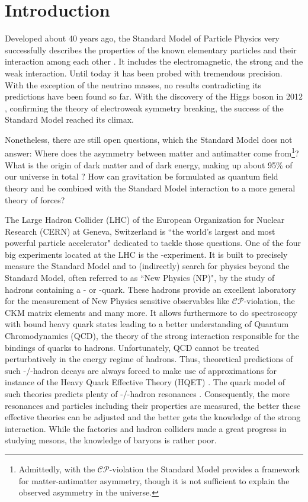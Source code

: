 \chapter{Introduction}
\label{sec:Introduction}
Developed about 40 years ago, the Standard Model of Particle Physics very successfully describes the properties of the known elementary particles and their interaction among each other \cite{SM_Glashow, SM_Salam, SM_Weinberg}.
It includes the electromagnetic, the strong and the weak interaction.
Until today it has been probed with tremendous precision.
With the exception of the neutrino masses, no results contradicting its predictions have been found so far.
With the discovery of the Higgs boson in 2012 \cite{Higgs_ATLAS, Higgs_CMS}, confirming the theory of electroweak symmetry breaking, the success of the Standard Model reached its climax.

Nonetheless, there are still open questions, which the Standard Model does not answer:
Where does the asymmetry between matter and antimatter come from\footnote{Admittedly, with the $\mathcal{CP}$-violation the Standard Model provides a framework for matter-antimatter asymmetry, though it is not sufficient to explain the observed asymmetry in the universe.}?
What is the origin of dark matter and of dark energy, making up about 95\% of our universe in total \cite{Planck_Universe}?
How can gravitation be formulated as quantum field theory and be combined with the Standard Model interaction to a more general theory of forces?

The Large Hadron Collider (LHC) of the European Organization for Nuclear Research (CERN) at Geneva, Switzerland is ``the world's largest and most powerful particle accelerator" \cite{CERN_LHC_web} dedicated to tackle those questions.
One of the four big experiments located at the LHC is the \lhcb-experiment.
It is built to precisely measure the Standard Model and to (indirectly) search for physics beyond the Standard Model, often referred to as ``New Physics (NP)", by the study of hadrons containing a \bquark- or \cquark-quark.
These hadrons provide an excellent laboratory for the measurement of New Physics sensitive observables like $\mathcal{CP}$-violation, the CKM matrix elements and many more.
It allows furthermore to do spectroscopy with bound heavy quark states leading to a better understanding of Quantum Chromodynamics (QCD), the theory of the strong interaction responsible for the bindings of quarks to hadrons.
Unfortunately, QCD cannot be treated perturbatively in the energy regime of hadrons.
Thus, theoretical predictions of such \bquark-/\cquark-hadron decays are always forced to make use of approximations for instance of the Heavy Quark Effective Theory (HQET) \cite{HQET_Introduction}.
The quark model of such theories predicts plenty of \bquark-/\cquark-hadron resonances \cite{cBaryons_Predictions}.
Consequently, the more resonances and particles including their properties are measured, the better these effective theories can be adjusted and the better gets the knowledge of the strong interaction.
While the \B factories and hadron colliders made a great progress in studying \bquark mesons, the knowledge of \bquark baryons is rather poor.

